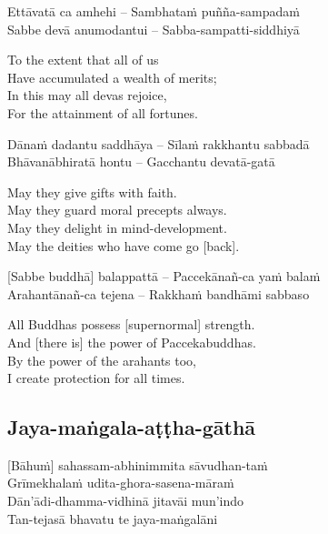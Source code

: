 
Ettāvatā ca amhehi – Sambhataṁ puñña-sampadaṁ\\
Sabbe devā anumodantui – Sabba-sampatti-siddhiyā

\begin{english}
  To the extent that all of us\\
  Have accumulated a wealth of merits;\\
  In this may all devas rejoice,\\
  For the attainment of all fortunes.
\end{english}

Dānaṁ dadantu saddhāya – Sīlaṁ rakkhantu sabbadā\\
Bhāvanābhiratā hontu – Gacchantu devatā-gatā

\begin{english}
  May they give gifts with faith.\\
  May they guard moral precepts always.\\
  May they delight in mind-development.\\
  May the deities who have come go [back].
\end{english}

[Sabbe buddhā] balappattā – Paccekānañ-ca yaṁ balaṁ\\
Arahantānañ-ca tejena – Rakkhaṁ bandhāmi sabbaso

\begin{english}
  All Buddhas possess [supernormal] strength.\\
  And [there is] the power of Paccekabuddhas.\\
  By the power of the arahants too,\\
  I create protection for all times.
\end{english}

\suttaRef{[MJG]}

\subsection{Jaya-maṅgala-aṭṭha-gāthā}
\label{jaya-mangala-attha-gatha}
[Bāhuṁ] sahassam-abhinimmita sāvudhan-taṁ\\
Grīmekhalaṁ udita-ghora-sasena-māraṁ\\
Dān’ādi-dhamma-vidhinā jitavāi mun’indo\\
Tan-tejasā bhavatu te jaya-maṅgalāni

